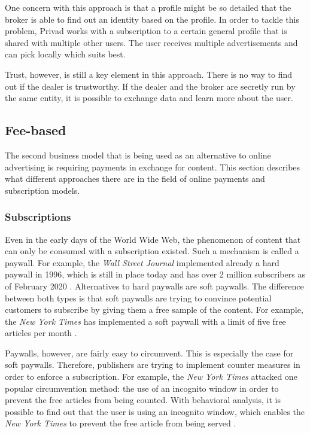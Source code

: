 One concern with this approach is that a profile might be so detailed that the broker is able to find out an identity based on the profile. In order to tackle this problem, Privad works with a subscription to a certain general profile that is shared with multiple other users. The user receives multiple advertisements and can pick locally which suits best.

Trust, however, is still a key element in this approach. There is no way to find out if the dealer is trustworthy. If the dealer and the broker are secretly run by the same entity, it is possible to exchange data and learn more about the user.

\subsection{Fee-based}

The second business model that is being used as an alternative to online advertising is requiring payments in exchange for content. This section describes what different approaches there are in the field of online payments and subscription models.

\subsubsection{Subscriptions}
\label{sec:subscriptions}

Even in the early days of the World Wide Web, the phenomenon of content that can only be consumed with a subscription existed. Such a mechanism is called a paywall. For example, the \textit{Wall Street Journal} implemented already a hard paywall in 1996, which is still in place today and has over 2 million subscribers as of February 2020 \cite{firstpaywall}.
Alternatives to hard paywalls are soft paywalls. The difference between both types is that soft paywalls are trying to convince potential customers to subscribe by giving them a free sample of the content. For example, the \textit{New York Times} has implemented a soft paywall with a limit of five free articles per month \cite{cook2012paying}.


Paywalls, however, are fairly easy to circumvent. This is especially the case for soft paywalls. Therefore, publishers are trying to implement counter measures in order to enforce a subscription. For example, the \textit{New York Times} attacked one popular circumvention method: the use of an incognito window in order to prevent the free articles from being counted. With behavioral analysis, it is possible to find out that the user is using an incognito window, which enables the \textit{New York Times} to prevent the free article from being served \cite{troupson2015yes}.

